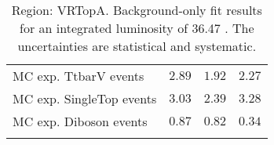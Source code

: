 \begin{table}
\begin{center}
{\begin{tabular*}{\textwidth}{@{\extracolsep{\fill}}lrrr}
        MC exp. TtbarV events         & $2.89$          & $1.92$          & $2.27$              \\
        MC exp. SingleTop events         & $3.03$          & $2.39$          & $3.28$              \\
        MC exp. Diboson events         & $0.87$          & $0.82$          & $0.34$              \\
\noalign{\smallskip}\hline\noalign{\smallskip}
\end{tabular*}
}
\end{center}
\caption{Region: VRTopA. Background-only fit results for an integrated luminosity of 36.47 \ifb. The uncertainties are statistical and systematic.
}
\label{table.bkgonly.VRTopA}
\end{table}
%